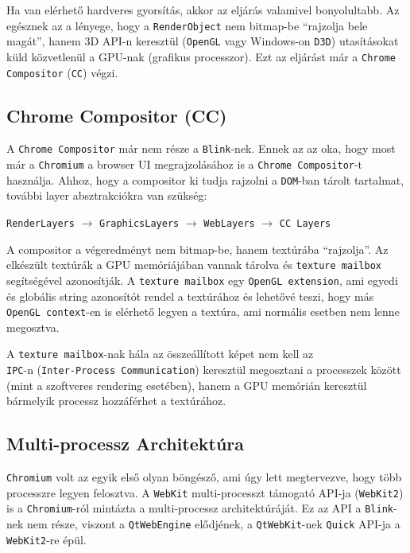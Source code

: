 \documentclass[12pt]{report}
\begin{document}
Ha van elérhető hardveres gyorsítás, akkor az eljárás valamivel bonyolultabb. Az egésznek az
a lényege, hogy a \texttt{RenderObject} nem bitmap-be ``rajzolja bele magát'', hanem 3D API-n
keresztül (\texttt{OpenGL} vagy Windows-on \texttt{D3D}) utasításokat küld közvetlenül a
GPU-nak (grafikus processzor). Ezt az eljárást már a \texttt{Chrome Compositor} (\texttt{CC})
végzi.
\cite{bib-chromium-gpu, bib-chromium-oopifs}

\subsection{Chrome Compositor (CC)}
A \texttt{Chrome Compositor} már nem része a \texttt{Blink}-nek.
Ennek az az oka, hogy most már a \texttt{Chromium} a browser UI megrajzolásához is a
\texttt{Chrome Compositor}-t használja.
Ahhoz, hogy a compositor ki tudja rajzolni a \texttt{DOM}-ban tárolt tartalmat,
további layer absztrakciókra van szükség:
\begin{center}
    \texttt{RenderLayers} $\rightarrow$ \texttt{GraphicsLayers} $\rightarrow$
    \texttt{WebLayers} $\rightarrow$ \texttt{CC Layers}
\end{center}

A compositor a végeredményt nem bitmap-be, hanem textúrába ``rajzolja''. Az elkészült
textúrák a GPU memóriájában vannak tárolva és \texttt{texture mailbox} segítségével
azonosítják. A \texttt{texture mailbox} egy \texttt{OpenGL extension}, ami egyedi és globális
string azonosítót rendel a textúrához és lehetővé teszi, hogy más \texttt{OpenGL context}-en
is elérhető legyen a textúra, ami normális esetben nem lenne megosztva.
\cite{bib-chromium-gpu, bib-chromium-oopifs}

A \texttt{texture mailbox}-nak hála az összeállított képet nem kell az \\
\texttt{IPC}-n (\texttt{Inter-Process Communication}) keresztül megosztani a processzek között
(mint a szoftveres rendering esetében), hanem a GPU memórián keresztül bármelyik
processz hozzáférhet a textúrához.
\cite{bib-chromium-texture-mailbox}

\subsection{Multi-processz Architektúra}
\texttt{Chromium} volt az egyik első olyan böngésző, ami úgy lett megtervezve, hogy több
processzre legyen felosztva. A \texttt{WebKit} multi-processzt támogató
API-ja (\texttt{WebKit2}) is a \texttt{Chromium}-ról mintázta a multi-processz
architektúráját. \cite{bib-webkit-webkit2}
Ez az API a \texttt{Blink}-nek nem része, viszont a \texttt{QtWebEngine} elődjének,
a \texttt{QtWebKit}-nek \texttt{Quick} API-ja a \texttt{WebKit2}-re épül.
\end{document}
